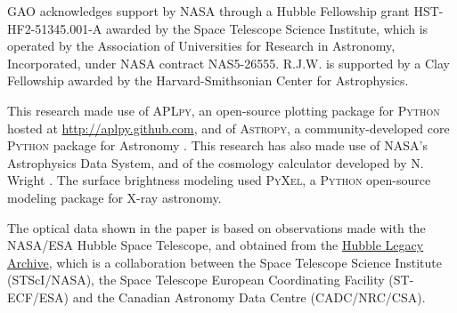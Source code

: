GAO acknowledges support by NASA through a Hubble Fellowship grant HST-HF2-51345.001-A awarded by the Space Telescope Science Institute, which is operated by the Association of Universities for Research in Astronomy, Incorporated, under NASA contract NAS5-26555. R.J.W. is supported by a Clay Fellowship awarded by the Harvard-Smithsonian Center for Astrophysics.

This research made use of \textsc{APLpy}, an open-source plotting package for \textsc{Python} hosted at \url{http://aplpy.github.com}, and of \textsc{Astropy}, a community-developed core \textsc{Python} package
  for Astronomy \citep{astropy}. This research has also made use of NASA's Astrophysics Data System, and of the cosmology calculator developed by N. Wright \citep{Wright2006}. The surface brightness modeling used \textsc{PyXel}, a \textsc{Python} open-source modeling package for X-ray astronomy.
  
 The optical data shown in the paper is based on observations made with the NASA/ESA Hubble Space Telescope, and obtained from the \href{http://hla.stsci.edu/}{Hubble Legacy Archive}, which is a collaboration between the Space Telescope Science Institute (STScI/NASA), the Space Telescope European Coordinating Facility (ST-ECF/ESA) and the Canadian Astronomy Data Centre (CADC/NRC/CSA).